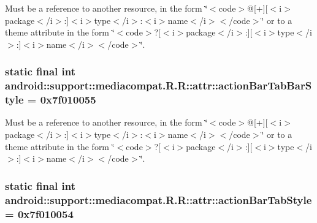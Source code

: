 Must be a reference to another resource, in the form \char`\"{}$<$code$>$@\mbox{[}+\mbox{]}\mbox{[}$<$i$>$package$<$/i$>$:\mbox{]}$<$i$>$type$<$/i$>$:$<$i$>$name$<$/i$>$$<$/code$>$\char`\"{} or to a theme attribute in the form \char`\"{}$<$code$>$?\mbox{[}$<$i$>$package$<$/i$>$:\mbox{]}\mbox{[}$<$i$>$type$<$/i$>$:\mbox{]}$<$i$>$name$<$/i$>$$<$/code$>$\char`\"{}. \hypertarget{classandroid_1_1support_1_1mediacompat_1_1_r_1_1attr_3a1fef9c5ce679cbd0df22480901b7f2}{
\subsubsection[{actionBarTabBarStyle}]{\setlength{\rightskip}{0pt plus 5cm}static final int android::support::mediacompat.R.R::attr::actionBarTabBarStyle = 0x7f010055}}
\label{classandroid_1_1support_1_1mediacompat_1_1_r_1_1attr_3a1fef9c5ce679cbd0df22480901b7f2}


Must be a reference to another resource, in the form \char`\"{}$<$code$>$@\mbox{[}+\mbox{]}\mbox{[}$<$i$>$package$<$/i$>$:\mbox{]}$<$i$>$type$<$/i$>$:$<$i$>$name$<$/i$>$$<$/code$>$\char`\"{} or to a theme attribute in the form \char`\"{}$<$code$>$?\mbox{[}$<$i$>$package$<$/i$>$:\mbox{]}\mbox{[}$<$i$>$type$<$/i$>$:\mbox{]}$<$i$>$name$<$/i$>$$<$/code$>$\char`\"{}. \hypertarget{classandroid_1_1support_1_1mediacompat_1_1_r_1_1attr_1d915678d85232f9287c18772ec2ea3b}{
\subsubsection[{actionBarTabStyle}]{\setlength{\rightskip}{0pt plus 5cm}static final int android::support::mediacompat.R.R::attr::actionBarTabStyle = 0x7f010054}}
\label{classandroid_1_1support_1_1mediacompat_1_1_r_1_1attr_1d915678d85232f9287c18772ec2ea3b}


